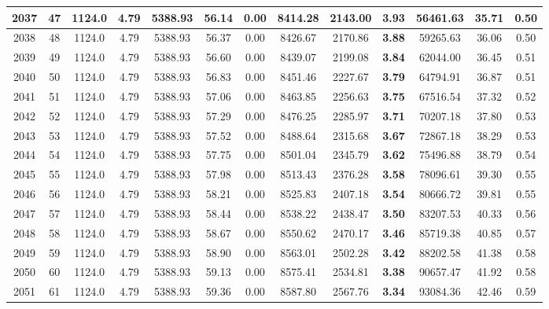 {\begin{center}
\begin{tabular}[htb]{|c|c||c|c|c|c|c|c||c|c||c|c|c||}
\hline 
 2037 &  47 &  1124.0 &  4.79 &  5388.93 &  56.14 &  0.00 &  8414.28 &  2143.00 &  {\bf 3.93} &  56461.63 &  35.71 &  0.50 \\ 
\hline 
 2038 &  48 &  1124.0 &  4.79 &  5388.93 &  56.37 &  0.00 &  8426.67 &  2170.86 &  {\bf 3.88} &  59265.63 &  36.06 &  0.50 \\ 
\hline 
 2039 &  49 &  1124.0 &  4.79 &  5388.93 &  56.60 &  0.00 &  8439.07 &  2199.08 &  {\bf 3.84} &  62044.00 &  36.45 &  0.51 \\ 
\hline 
 2040 &  50 &  1124.0 &  4.79 &  5388.93 &  56.83 &  0.00 &  8451.46 &  2227.67 &  {\bf 3.79} &  64794.91 &  36.87 &  0.51 \\ 
\hline 
 2041 &  51 &  1124.0 &  4.79 &  5388.93 &  57.06 &  0.00 &  8463.85 &  2256.63 &  {\bf 3.75} &  67516.54 &  37.32 &  0.52 \\ 
\hline 
 2042 &  52 &  1124.0 &  4.79 &  5388.93 &  57.29 &  0.00 &  8476.25 &  2285.97 &  {\bf 3.71} &  70207.18 &  37.80 &  0.53 \\ 
\hline 
 2043 &  53 &  1124.0 &  4.79 &  5388.93 &  57.52 &  0.00 &  8488.64 &  2315.68 &  {\bf 3.67} &  72867.18 &  38.29 &  0.53 \\ 
\hline 
 2044 &  54 &  1124.0 &  4.79 &  5388.93 &  57.75 &  0.00 &  8501.04 &  2345.79 &  {\bf 3.62} &  75496.88 &  38.79 &  0.54 \\ 
\hline 
 2045 &  55 &  1124.0 &  4.79 &  5388.93 &  57.98 &  0.00 &  8513.43 &  2376.28 &  {\bf 3.58} &  78096.61 &  39.30 &  0.55 \\ 
\hline 
 2046 &  56 &  1124.0 &  4.79 &  5388.93 &  58.21 &  0.00 &  8525.83 &  2407.18 &  {\bf 3.54} &  80666.72 &  39.81 &  0.55 \\ 
\hline 
 2047 &  57 &  1124.0 &  4.79 &  5388.93 &  58.44 &  0.00 &  8538.22 &  2438.47 &  {\bf 3.50} &  83207.53 &  40.33 &  0.56 \\ 
\hline 
 2048 &  58 &  1124.0 &  4.79 &  5388.93 &  58.67 &  0.00 &  8550.62 &  2470.17 &  {\bf 3.46} &  85719.38 &  40.85 &  0.57 \\ 
\hline 
 2049 &  59 &  1124.0 &  4.79 &  5388.93 &  58.90 &  0.00 &  8563.01 &  2502.28 &  {\bf 3.42} &  88202.58 &  41.38 &  0.58 \\ 
\hline 
 2050 &  60 &  1124.0 &  4.79 &  5388.93 &  59.13 &  0.00 &  8575.41 &  2534.81 &  {\bf 3.38} &  90657.47 &  41.92 &  0.58 \\ 
\hline 
 2051 &  61 &  1124.0 &  4.79 &  5388.93 &  59.36 &  0.00 &  8587.80 &  2567.76 &  {\bf 3.34} &  93084.36 &  42.46 &  0.59 \\ 

\end{tabular}
\end{center}}
